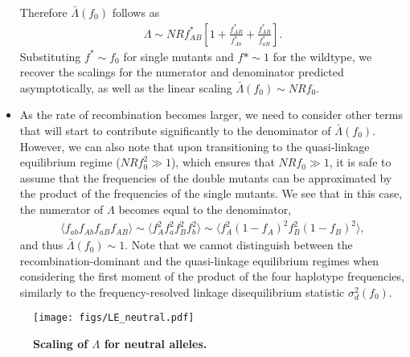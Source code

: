 \documentclass[aps,rmp,twocolumn,groupedaddress,floatfix,notitlepage]{revtex4-1}
\begin{document}
\begin{itemize}
Therefore $\bar{\Lambda}(f_0)$ follows as 
\begin{align}\label{eq:lambda_heuristics}
    \Lambda \sim NR f^*_{AB} \left[ 1 + \frac{f^*_{AB}}{f^*_{Ab}} + \frac{f^*_{AB}}{f^*_{aB}}\right].
\end{align}
Substituting $f^* \sim f_0$ for single mutants and $f* \sim 1$ for the wildtype, we recover the scalings for the numerator and denominator predicted asymptotically, as well as the linear scaling $\bar{\Lambda}(f_0)\sim NRf_0$.


\item As the rate of recombination becomes larger, we need to consider other terms that will start to contribute significantly to the denominator of $\bar{\Lambda}(f_0)$. However, we can also note that upon transitioning to the quasi-linkage equilibrium regime ($NRf_0^2 \gg 1$), which ensures that $NRf_0 \gg 1$, it is safe to assume that the frequencies of the double mutants can be approximated by the product of the frequencies of the single mutants. We see that in this case, the numerator of $\Lambda$ becomes equal to the denominator, 
\begin{align}
    \langle f_{ab} f_{Ab} f_{aB} f_{AB}\rangle \sim \langle f_A^2 f_a^2 f_B^2 f_b^2 \rangle \sim \langle f_A^2 (1 - f_A)^2 f_B^2 (1 - f_B)^2 \rangle,
\end{align}
and thus $\bar{\Lambda}(f_0) \sim 1$. Note that we cannot distinguish between the recombination-dominant and the quasi-linkage equilibrium regimes when considering the first moment of the product of the four haplotype frequencies, similarly to the frequency-resolved linkage disequilibrium statistic $\sigma_d^2 (f_0)$.

\end{itemize}

\begin{figure*}[h!]
    \centering
    \texttt{[image: figs/LE\_neutral.pdf]} 
    \hfill
    \caption{\textbf{Scaling of $\Lambda$ for neutral alleles.}  \label{fig:neutral_LE}}
\end{figure*}

\newpage
\end{document}

